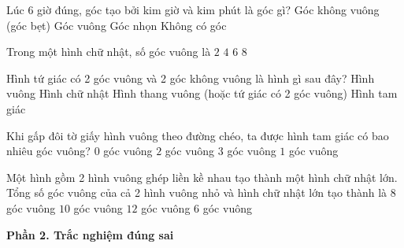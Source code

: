 \begin{ex} %
Lúc 6 giờ đúng, góc tạo bởi kim giờ và kim phút là góc gì?
\choice
{\True Góc không vuông (góc bẹt)}
{Góc vuông}
{Góc nhọn}
{Không có góc}
\end{ex}

\begin{ex} %
Trong một hình chữ nhật, số góc vuông là
\choice
{$2$}
{\True $4$}
{$6$}
{$8$}
\end{ex}

\begin{ex} %
Hình tứ giác có 2 góc vuông và 2 góc không vuông là hình gì sau đây?
\choice
{Hình vuông}
{Hình chữ nhật}
{\True Hình thang vuông (hoặc tứ giác có 2 góc vuông)}
{Hình tam giác}
\end{ex}

\begin{ex} %
Khi gấp đôi tờ giấy hình vuông theo đường chéo, ta được hình tam giác có bao nhiêu góc vuông?
\choice
{$0$ góc vuông}
{$2$ góc vuông}
{$3$ góc vuông}
{\True $1$ góc vuông}
\end{ex}

\begin{ex} %
Một hình gồm 2 hình vuông ghép liền kề nhau tạo thành một hình chữ nhật lớn. Tổng số góc vuông của cả 2 hình vuông nhỏ và hình chữ nhật lớn tạo thành là
\choice
{$8$ góc vuông}
{$10$ góc vuông}
{\True $12$ góc vuông}
{$6$ góc vuông}
\end{ex}

\textbf{Phần 2. Trắc nghiệm đúng sai}

